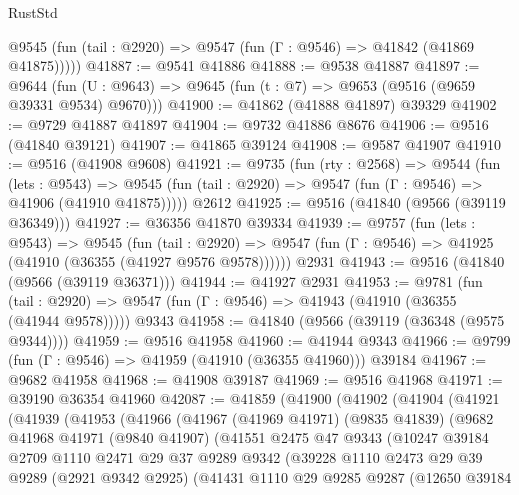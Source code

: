 \begin{lexlean}{RustStd}
\begin{coremodule}
      @9545 (fun (tail : @2920) => @9547 (fun (Γ : @9546) => @41842 (@41869 @41875)))))
@41887 := @9541 @41886
@41888 := @9538 @41887
@41897 := @9644
    (fun (U : @9643) => @9645 (fun (t : @7) => @9653 (@9516 (@9659 @39331 @9534) @9670)))
@41900 := @41862 (@41888 @41897) @39329
@41902 := @9729 @41887 @41897
@41904 := @9732 @41886 @8676
@41906 := @9516 (@41840 @39121)
@41907 := @41865 @39124
@41908 := @9587 @41907
@41910 := @9516 (@41908 @9608)
@41921 := @9735
    (fun (rty : @2568) =>
    @9544
      (fun (lets : @9543) =>
      @9545 (fun (tail : @2920) => @9547 (fun (Γ : @9546) => @41906 (@41910 @41875)))))
    @2612
@41925 := @9516 (@41840 (@9566 (@39119 @36349)))
@41927 := @36356 @41870 @39334
@41939 := @9757
    (fun (lets : @9543) =>
    @9545
      (fun (tail : @2920) =>
      @9547 (fun (Γ : @9546) => @41925 (@41910 (@36355 (@41927 @9576 @9578))))))
    @2931
@41943 := @9516 (@41840 (@9566 (@39119 @36371)))
@41944 := @41927 @2931
@41953 := @9781
    (fun (tail : @2920) => @9547 (fun (Γ : @9546) => @41943 (@41910 (@36355 (@41944 @9578)))))
    @9343
@41958 := @41840 (@9566 (@39119 (@36348 (@9575 @9344))))
@41959 := @9516 @41958
@41960 := @41944 @9343
@41966 := @9799 (fun (Γ : @9546) => @41959 (@41910 (@36355 @41960))) @39184
@41967 := @9682 @41958
@41968 := @41908 @39187
@41969 := @9516 @41968
@41971 := @39190 @36354 @41960
@42087 := @41859
    (@41900
      (@41902
        (@41904
          (@41921
            (@41939
              (@41953
                (@41966
                  (@41967
                    (@41969 @41971)
                    (@9835 @41839)
                    (@9682
                      @41968
                      @41971
                      (@9840 @41907)
                      (@41551
                        @2475
                        @47
                        @9343
                        (@10247
                          @39184
                          @2709
                          @1110
                          @2471
                          @29
                          @37
                          @9289
                          @9342
                          (@39228
                            @1110
                            @2473
                            @29
                            @39
                            @9289
                            (@2921 @9342 @2925)
                            (@41431
                              @1110
                              @29
                              @9285
                              @9287
                              (@12650
                                @39184

\end{coremodule}
\end{lexlean}
